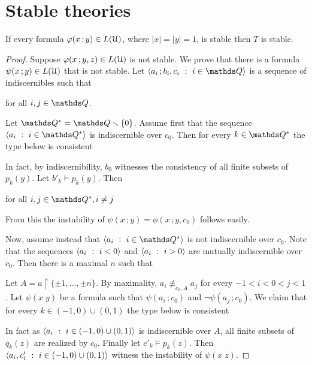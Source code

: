 \section{Stable theories}
\label{stable_theories}

\begin{theorem}
  If every formula $\varphi(x\,;y)\in L(\EuScript U)$, where $|x|=|y|=1$, is stable then $T$ is stable.
\end{theorem} 

\begin{proof}
  Suppose $\varphi(x\,;y,z)\in L(\EuScript U)$ is not stable.
  We prove that there is a formula $\psi(x\,;y)\in L(\EuScript U)$ that is not stable.
  Let $\<a_i\,;b_i,c_i\ :\ i\in\QQ\>$ is a sequence of indiscernibles such that 

  \hfill for all $i,j\in\QQ$.

  Let $\QQ^*=\QQ\sm\{0\}$.
  Assume first that the sequence $\<a_i\ :\ i\in\QQ^*\>$ is indiscernible over $c_0$.
  Then for every $k\in\QQ^*$ the type below is consistent


  In fact, by indiscernibility, $b_0$ witnesses the consistency of all finite subsets of $p_k(y)$.
  Let $b'_k\models p_k(y)$.
  Then

  \hfill for all $i,j\in\QQ^*, i\neq j$

  From this the instability of $\psi(x\,;y)=\phi(x\,;y,c_0)$ follows easily.

  Now, assume instead that $\<a_i\ :\ i\in\QQ^*\>$ is not indiscernible over $c_0$.
  Note that the sequences $\<a_i\ :\ i<0\>$ and $\<a_i\ :\ i>0\>$ are mutually indiscernible over $c_0$.
  Then there is a maximal $n$ such that


  Let $A=a\restriction\{\pm1,\dots,\pm n\}$.
  By maximality, $a_i\nequiv_{c_0,A}a_j$ for every $-1<i<0<j<1$.
  Let $\psi(x\;y)$ be a formula such that $\psi(a_i\,;c_0)$ and $\neg\psi(a_j\,;c_0)$.
  We claim that for every $k\in(-1,0)\cup(0,1)$ the type below is consistent


  In fact as $\<a_i\ :\ i\in(-1,0)\cup(0,1)\>$ is indiscernible over $A$, all finite subsets of $q_k(z)$ are realized by $c_0$.
  Finally let $c'_k\models p_k(z)$.
  Then $\<a_i,c'_i\ :\ i\in(-1,0)\cup(0,1)\>$ witness the instability of $\psi(x\;z)$.
\end{proof}

